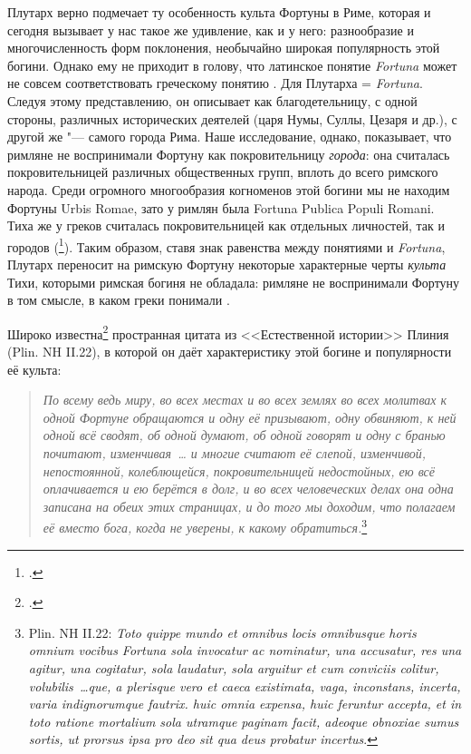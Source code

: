 

Плутарх верно подмечает ту особенность культа Фортуны в Риме, которая и сегодня вызывает у нас такое же удивление, как и у него: разнообразие и многочисленность форм поклонения, необычайно широкая популярность этой богини. Однако ему не приходит в голову, что латинское понятие \textit{Fortuna} может не совсем соответствовать греческому понятию . Для Плутарха  = \textit{Fortuna}. Следуя этому представлению, он описывает  как благодетельницу, с одной стороны, различных исторических деятелей (царя Нумы, Суллы, Цезаря и др.), с другой же "--- самого города Рима. Наше исследование, однако, показывает, что римляне не воспринимали Фортуну как покровительницу \textit{города}: она считалась покровительницей различных общественных групп, вплоть до всего римского народа. Среди огромного многообразия когноменов этой богини мы не находим Фортуны Urbis Romae, зато у римлян была Fortuna Publica Populi Romani. Тиха же у греков считалась покровительницей как отдельных личностей, так и городов (\footcite[Sp. 1345]{Tyche1915Wasser}). Таким образом, ставя знак равенства между понятиями  и \textit{Fortuna}, Плутарх переносит на римскую Фортуну некоторые характерные черты \textit{культа} Тихи, которыми римская богиня не обладала: римляне не воспринимали Фортуну в том смысле, в каком греки понимали .


Широко известна\footcites[С. 321]{ESBE1902}[P. 79]{Ferguson1970}[P. 134 ff]{Arya2002} пространная цитата из <<Естественной истории>> Плиния (Plin. NH II.22), в которой он даёт характеристику этой богине и популярности её культа:

\begin{quote}
\textit{По всему ведь миру, во всех местах и во всех землях во всех молитвах к одной Фортуне обращаются и одну её призывают, одну обвиняют, к ней одной всё сводят, об одной думают, об одной говорят и одну с бранью почитают, изменчивая~\ldots{} и многие считают её слепой, изменчивой, непостоянной, колеблющейся, покровительницей недостойных, ею всё оплачивается и ею берётся в долг, и во всех человеческих делах она одна записана на обеих этих страницах, и до того мы доходим, что полагаем её вместо бога, когда не уверены, к какому обратиться.}\footnote{Plin. NH II.22: \textit{Toto quippe mundo et omnibus locis omnibusque horis omnium vocibus Fortuna sola invocatur ac nominatur, una accusatur, res una agitur, una cogitatur, sola laudatur, sola arguitur et cum conviciis colitur, volubilis~\ldots que, a plerisque vero et caeca existimata, vaga, inconstans, incerta, varia indignorumque fautrix. huic omnia expensa, huic feruntur accepta, et in toto ratione mortalium sola utramque paginam facit, adeoque obnoxiae sumus sortis, ut prorsus ipsa pro deo sit qua deus probatur incertus}.}
\end{quote}

